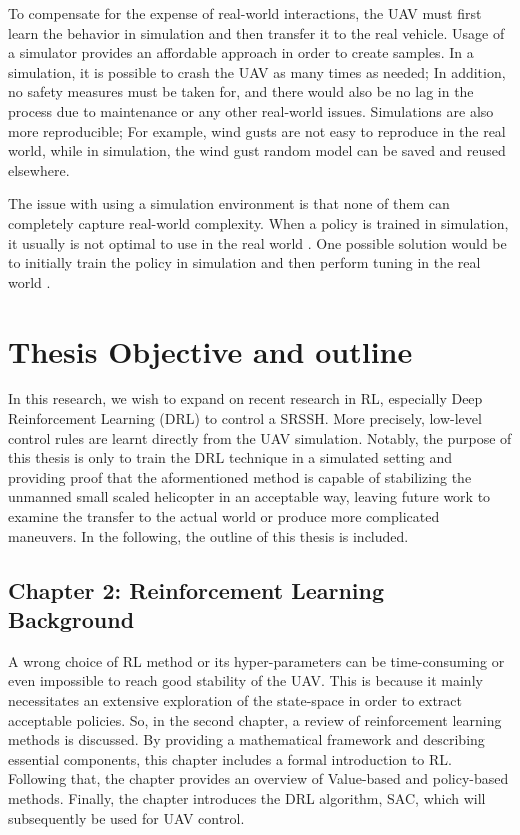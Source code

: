 To compensate for the expense of real-world interactions, the UAV must first learn the behavior in simulation and then transfer it to the real vehicle. Usage of a simulator provides an affordable approach in order to create samples. In a simulation, it is possible to crash the UAV as many times as needed; In addition, no safety measures must be taken for, and there would also be no lag in the process due to maintenance or any other real-world issues. Simulations are also more reproducible; For example, wind gusts are not easy to reproduce in the real world, while in simulation, the wind gust random model can be saved and reused elsewhere. 

The issue with using a simulation environment is that none of them can completely capture real-world complexity. When a policy is trained in simulation, it usually is not optimal to use in the real world \cite{zhao2020sim}. One possible solution would be to initially train the policy in simulation and then perform tuning in the real world \cite{tran2015reinforcement, tzeng2015simultaneous}.\\

\section{Thesis Objective and outline}

In this research, we wish to expand on recent research in RL, especially Deep Reinforcement Learning (DRL) to control a SRSSH. More precisely, low-level control rules are learnt directly from the UAV simulation. Notably, the purpose of this thesis is only to train the DRL technique in a simulated setting and providing proof that the aformentioned method is capable of stabilizing the unmanned small scaled helicopter in an acceptable way, leaving future work to examine the transfer to the actual world or produce more complicated maneuvers. In the following, the outline of this thesis is included.

\subsection{Chapter 2: Reinforcement Learning Background}

A wrong choice of RL method or its hyper-parameters can be time-consuming or even impossible to reach good stability of the UAV. This is because it mainly necessitates an extensive exploration of the state-space in order to extract acceptable policies. So, in the second chapter, a review of reinforcement learning methods is discussed. By providing a mathematical framework and describing essential components, this chapter includes a formal introduction to RL. Following that, the chapter provides an overview of Value-based and policy-based methods. Finally, the chapter introduces the DRL algorithm, SAC, which will subsequently be used for UAV control.

